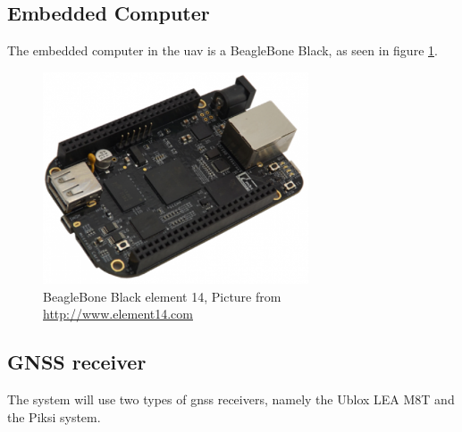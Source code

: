\subsection{Embedded Computer}
The embedded computer in the \gls{uav} is a BeagleBone Black, as seen in figure \ref{figure:BeagleBone}.
\begin{figure}[H]
	\centering
		\includegraphics[width=0.7\textwidth]{figs/BeagleBoneBlackE14.png}
		\caption{BeagleBone Black element 14, Picture from \url{http://www.element14.com}}
		\label{figure:BeagleBone}
\end{figure}
\subsection{GNSS receiver}
The system will use two types of \gls{gnss} receivers, namely the Ublox LEA M8T and the Piksi system. 
